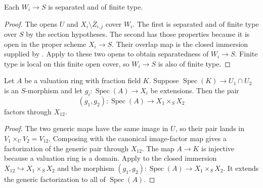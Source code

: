 \begin{lemma}
  \label{lemma:nagata-intermediate-separated}

  Each $W_i\to S$ is separated and of finite type.
\end{lemma}

\begin{proof}
  The opens $U$ and $X_i\setminus\overline Z_{i,j}$ cover $W_i$.  The first
  is separated and of finite type over $S$ by the section hypotheses.  The
  second has those properties because it is open in the proper scheme
  $X_i\to S$.  Their overlap map is the closed immersion supplied by
  .  Apply
   to these two opens to obtain
  separatedness of $W_i\to S$.  Finite type is local on this finite open
  cover, so $W_i\to S$ is also of finite type.
\end{proof}

\begin{lemma}
  \label{lemma:nagata-valuation-pair-factors-comparison}

  Let $A$ be a valuation ring with fraction field $K$.  Suppose
  $\operatorname{Spec}(K)\to U_1\cap U_2$ is an $S$-morphism and let
  $g_i\colon\operatorname{Spec}(A)\to X_i$ be extensions.  Then the pair
  \[
    (g_1,g_2)\colon\operatorname{Spec}(A)\to X_1\times_SX_2
  \]
  factors through $X_{12}$.
\end{lemma}

\begin{proof}
  The two generic maps have the same image in $U$, so their pair lands in
  $V_1\times_UV_2=V_{12}$.  Composing with the canonical image-factor map
  gives a factorization of the generic pair through $X_{12}$.  The map
  $A\to K$ is injective because a valuation ring is a domain.  Apply
   to the closed immersion
  $X_{12}\hookrightarrow X_1\times_SX_2$ and the morphism
  $(g_1,g_2)\colon\operatorname{Spec}(A)\to X_1\times_SX_2$.  It extends the
  generic factorization to all of $\operatorname{Spec}(A)$.
\end{proof}

